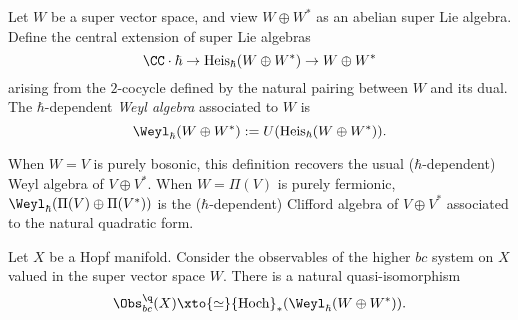\begin{dfn}
Let $W$ be a super vector space, and view $W \oplus W^*$ as an abelian super Lie algebra. 
Define the central extension of super Lie algebras
\[
\CC \cdot \hbar \to {\rm Heis}_\hbar (W \oplus W^*) \to W \oplus W^*
\]
arising from the $2$-cocycle defined by the natural pairing between $W$ and its dual. 
The $\hbar$-dependent {\em Weyl algebra} associated to $W$ is
\[
\Weyl_\hbar(W \oplus W^*) := U({\rm Heis}_\hbar(W \oplus W^*)) .
\]
\end{dfn}

\begin{rmk}
When $W = V$ is purely bosonic, this definition recovers the usual ($\hbar$-dependent) Weyl algebra of $V \oplus V^*$. 
When $W = \Pi(V)$ is purely fermionic, $\Weyl_\hbar(\Pi(V) \oplus \Pi(V^*))$ is the ($\hbar$-dependent) Clifford algebra of $V\oplus V^*$ associated to the natural quadratic form.  
\end{rmk} 

\begin{lem}\label{lem: hopfcliff}
Let $X$ be a Hopf manifold. 
Consider the observables of the higher $bc$ system on $X$ valued in the super vector space $W$. 
There is a natural quasi-isomorphism
\[
\Obs^\q_{bc}(X) \xto{\simeq} {\rm Hoch}_*(\Weyl_\hbar(W \oplus W^*)) .
\]
\end{lem}

